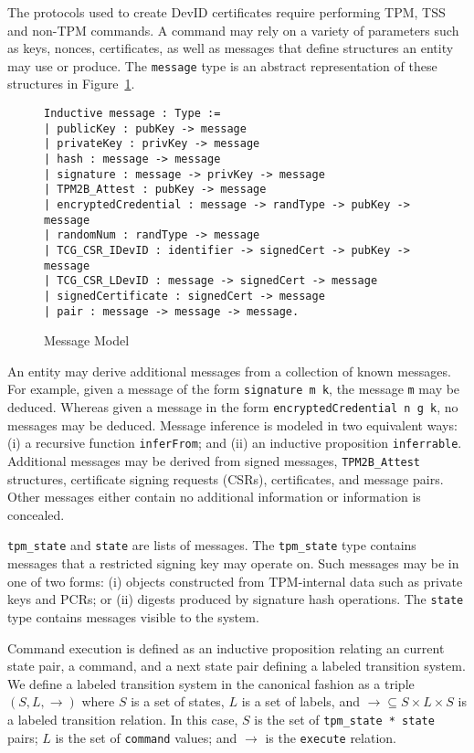\documentclass[runningheads]{llncs}
\begin{document}
The protocols used to create DevID certificates require performing
TPM, TSS and non-TPM commands. A command may rely on a variety of
parameters such as keys, nonces, certificates, as well as messages
that define structures an entity may use or produce. The
\verb|message| type is an abstract representation of these structures
in Figure~\ref{fig:message-model}.

\begin{figure}[hbtp]
\begin{lstlisting}[language=Coq]
Inductive message : Type :=
| publicKey : pubKey -> message
| privateKey : privKey -> message
| hash : message -> message
| signature : message -> privKey -> message
| TPM2B_Attest : pubKey -> message
| encryptedCredential : message -> randType -> pubKey -> message
| randomNum : randType -> message
| TCG_CSR_IDevID : identifier -> signedCert -> pubKey -> message
| TCG_CSR_LDevID : message -> signedCert -> message
| signedCertificate : signedCert -> message
| pair : message -> message -> message.
\end{lstlisting}
\caption{Message Model}
\label{fig:message-model}
\end{figure}

An entity may derive additional messages from a collection of known
messages. For example, given a message of the form
\verb|signature m k|, the message \verb|m| may be deduced. Whereas
given a message in the form \verb|encryptedCredential n g k|, no
messages may be deduced. Message inference is modeled in two
equivalent ways: (i) a recursive function \verb|inferFrom|; and (ii)
an inductive proposition \verb|inferrable|.  Additional messages may
be derived from signed messages, \verb|TPM2B_Attest| structures,
certificate signing requests (CSRs), certificates, and message
pairs. Other messages either contain no additional information or
information is concealed.


\verb|tpm_state| and \verb|state| are lists of messages. The
\verb|tpm_state| type contains messages that a restricted signing key
may operate on. Such messages may be in one of two forms: (i) objects
constructed from TPM-internal data such as private keys and PCRs; or
(ii) digests produced by signature hash operations.  The \verb|state|
type contains messages visible to the system.

Command execution is defined as an inductive proposition relating an
current state pair, a command, and a next state pair defining a
labeled transition system. We define a labeled transition system in
the canonical fashion as a triple $(S,L,\rightarrow)$ where $S$ is a
set of states, $L$ is a set of labels, and
$\rightarrow \subseteq S \times L \times S$ is a labeled transition
relation. In this case, $S$ is the set of \verb|tpm_state * state|
pairs; $L$ is the set of \verb|command| values; and $\rightarrow$ is
the \verb|execute| relation.
\end{document}
